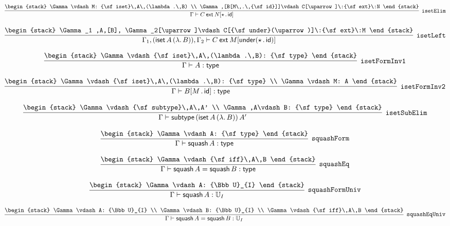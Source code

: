 \[
\infer[{\tt isetElim}]{\Gamma \vdash C\:{\sf ext}\:N[\star \,.\,{\sf id}]}{
\begin{stack}
\Gamma \vdash M: {\sf iset}\,A\,(\lambda .\,B)
\\
\Gamma ,[B[M\,.\,{\sf id}]]\vdash C[\uparrow ]\:{\sf ext}\:N
\end{stack}}
\]

\[
\infer[{\tt isetLeft}]{\Gamma_1 ,({\sf iset}\,A\,(\lambda .\,B)), \Gamma_2 \vdash C\:{\sf ext}\:M[{\sf under}(\star \,.\,{\sf id})]}{
\begin{stack}
\Gamma_1 ,A,[B], \Gamma_2[\uparrow ]\vdash C[{\sf under}(\uparrow )]\:{\sf ext}\:M
\end{stack}}
\]

\[
\infer[{\tt isetFormInv1}]{\Gamma \vdash A: {\sf type}}{
\begin{stack}
\Gamma \vdash {\sf iset}\,A\,(\lambda .\,B): {\sf type}
\end{stack}}
\]

\[
\infer[{\tt isetFormInv2}]{\Gamma \vdash B[M\,.\,{\sf id}]: {\sf type}}{
\begin{stack}
\Gamma \vdash {\sf iset}\,A\,(\lambda .\,B): {\sf type}
\\
\Gamma \vdash M: A
\end{stack}}
\]

\[
\infer[{\tt isetSubElim}]{\Gamma \vdash {\sf subtype}\,({\sf iset}\,A\,(\lambda .\,B))\,A'}{
\begin{stack}
\Gamma \vdash {\sf subtype}\,A\,A'
\\
\Gamma ,A\vdash B: {\sf type}
\end{stack}}
\]

\[
\infer[{\tt squashForm}]{\Gamma \vdash {\sf squash}\,A: {\sf type}}{
\begin{stack}
\Gamma \vdash A: {\sf type}
\end{stack}}
\]

\[
\infer[{\tt squashEq}]{\Gamma \vdash {\sf squash}\,A= {\sf squash}\,B: {\sf type}}{
\begin{stack}
\Gamma \vdash {\sf iff}\,A\,B
\end{stack}}
\]

\[
\infer[{\tt squashFormUniv}]{\Gamma \vdash {\sf squash}\,A: {\Bbb U}_{I}}{
\begin{stack}
\Gamma \vdash A: {\Bbb U}_{I}
\end{stack}}
\]

\[
\infer[{\tt squashEqUniv}]{\Gamma \vdash {\sf squash}\,A= {\sf squash}\,B: {\Bbb U}_{I}}{
\begin{stack}
\Gamma \vdash A: {\Bbb U}_{I}
\\
\Gamma \vdash B: {\Bbb U}_{I}
\\
\Gamma \vdash {\sf iff}\,A\,B
\end{stack}}
\]

